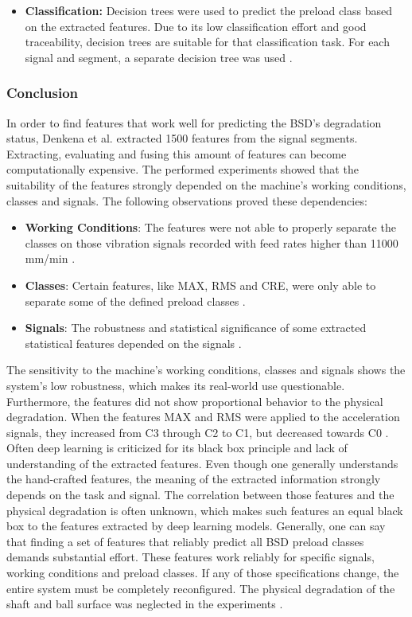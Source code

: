 \begin{itemize}
    \item \textbf{Classification:} Decision trees were used to predict the preload class based on the extracted features. Due to its low classification effort and good traceability, decision trees are suitable for that classification task. For each signal and segment, a separate decision tree was used \cite{Denkena2021}. 
\end{itemize}

\subsubsection{Conclusion}
In order to find features that work well for predicting the BSD's degradation status, Denkena et al. \cite{Denkena2021} extracted 1500 features from the signal segments. Extracting, evaluating and fusing this amount of features can become computationally expensive. The performed experiments showed that the suitability of the features strongly depended on the machine's working conditions, classes and signals. The following observations proved these dependencies:
\begin{itemize}
    \item \textbf{Working Conditions}: The features were not able to properly separate the classes on those vibration signals recorded with feed rates higher than 11000 mm/min \cite{Denkena2021}. 
    \item \textbf{Classes}: Certain features, like MAX, RMS and CRE, were only able to separate some of the defined preload classes \cite{Denkena2021}. 
    \item \textbf{Signals}: The robustness and statistical significance of some extracted statistical features depended on the signals \cite{Denkena2021}. 
\end{itemize}
The sensitivity to the machine's working conditions, classes and signals shows the system's low robustness, which makes its real-world use questionable. Furthermore, the features did not show proportional behavior to the physical degradation. When the features MAX and RMS were applied to the acceleration signals, they increased from C3 through C2 to C1, but decreased towards C0 \cite{Denkena2021}. Often deep learning is criticized for its black box principle and lack of understanding of the extracted features. Even though one generally understands the hand-crafted features, the meaning of the extracted information strongly depends on the task and signal. The correlation between those features and the physical degradation is often unknown, which makes such features an equal black box to the features extracted by deep learning models. Generally, one can say that finding a set of features that reliably predict all BSD preload classes demands substantial effort. These features work reliably for specific signals, working conditions and preload classes. If any of those specifications change, the entire system must be completely reconfigured. The physical degradation of the shaft and ball surface was neglected in the experiments \cite{Denkena2021}.


